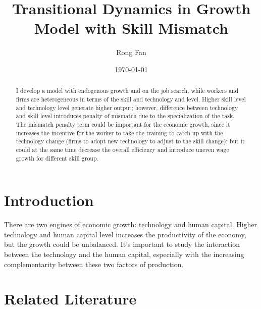 \documentclass{article}
\title{Transitional Dynamics in Growth Model with Skill Mismatch}
\date{\today}
\author{Rong Fan}
\newcommand{\1}{\mathbb{1}}
\begin{document}
\maketitle
\begin{abstract}
I develop a model with endogenous growth and on the job search, while workers and firms are heterogeneous in terms of the skill and technology and level. Higher skill level and technology level generate higher output; however, difference between technology and skill level introduces penalty of mismatch due to the specialization of the task. The mismatch penalty term could be important for the economic growth, since it increases the incentive for the worker to take the training to catch up with the technology change (firms to adopt new technology to adjust to the skill change); but it could at the same time decrease the overall efficiency and introduce uneven wage growth for different skill group. 
\end{abstract}

\clearpage
\section{Introduction}
There are two engines of economic growth: technology and human capital. Higher technology and human capital level increases the productivity of the economy, but the growth could be unbalanced. It's important to study the interaction between the technology and the human capital, especially with the increasing complementarity between these two factors of production. 

\clearpage
\section{Related Literature}
\end{document}
